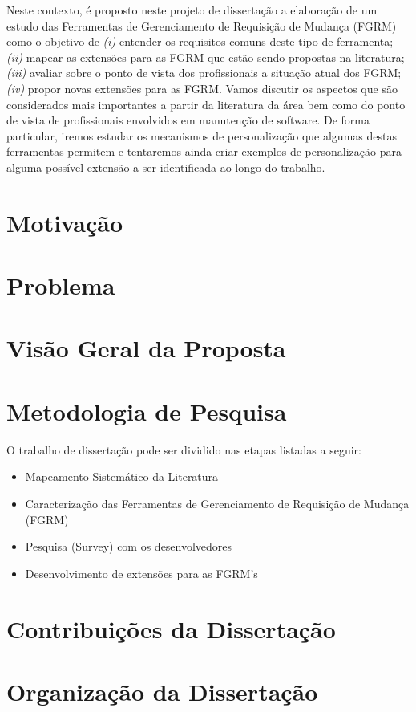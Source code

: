 Neste contexto, é proposto neste projeto de dissertação a elaboração de um estudo das Ferramentas de Gerenciamento de Requisição de Mudança (FGRM) como o objetivo de \textit{(i)} entender os requisitos comuns deste tipo de ferramenta; \textit{(ii)} mapear as extensões para as FGRM que estão sendo propostas na literatura; \textit{(iii)} avaliar sobre o ponto de vista dos profissionais a situação atual dos FGRM; \textit{(iv)} propor novas extensões para as FGRM. Vamos discutir os aspectos que são
considerados mais importantes a partir da literatura da área bem como do ponto de vista de profissionais envolvidos em manutenção de software. De forma particular, iremos estudar os mecanismos de personalização que algumas destas ferramentas permitem e tentaremos ainda criar exemplos de personalização para alguma possível extensão a ser identificada ao longo do trabalho.

\section{Motivação}
\label{sec:intro-motivacao}

\section{Problema}
\label{sec:intro-problema}

\section{Visão Geral da Proposta}
\label{sec:intro-visao-geral}

\section{Metodologia de Pesquisa}
\label{sec:intro-metodologia}

O trabalho de dissertação pode ser dividido nas etapas listadas a seguir:

\begin{itemize}[(i)]
	\item Mapeamento Sistemático da Literatura \cite{keele2007guidelines}
	\item Caracterização das Ferramentas de Gerenciamento de Requisição de Mudança (FGRM)
	\item Pesquisa (Survey) com os desenvolvedores \cite{wohlin2012experimentation}
	\item Desenvolvimento de extensões para as FGRM's
\end{itemize}

\section{Contribuições da Dissertação}
\label{sec:intro-contribuicao}

\section{Organização da Dissertação}
\label{sec:intro-organizacao-dissertacao}
